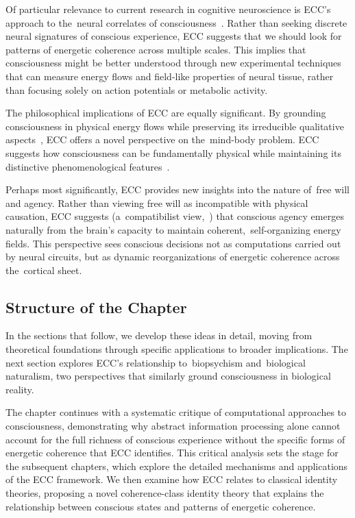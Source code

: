 Of particular relevance to current research in cognitive neuroscience is ECC's approach to the~neural correlates of consciousness~\cite{dehaene2011experimental}. Rather than seeking discrete neural signatures of conscious experience, ECC suggests that we should look for patterns of energetic coherence across multiple scales. This implies that consciousness might be better understood through new experimental techniques that can measure energy flows and field-like properties of neural tissue, rather than focusing solely on action potentials or metabolic activity.

The philosophical implications of ECC are equally significant. By grounding consciousness in physical energy flows while preserving its irreducible qualitative aspects~\cite{nagel1980like}, ECC offers a novel perspective on the~mind-body problem. ECC suggests how consciousness can be fundamentally physical while maintaining its distinctive phenomenological features~\cite{block1995confusion}.

Perhaps most significantly, ECC provides new insights into the nature of~free will and agency. Rather than viewing free will as incompatible with physical causation, ECC suggests (a~compatibilist view,~\cite{Beebee2002}) that conscious agency emerges naturally from the brain's capacity to maintain coherent,~self-organizing energy fields. This perspective sees conscious decisions not as computations carried out by neural circuits, but as dynamic reorganizations of energetic coherence across the~cortical sheet.

\subsection*{Structure of the Chapter}

In the sections that follow, we develop these ideas in detail, moving from theoretical foundations through specific applications to broader implications. The next section explores ECC's relationship to~biopsychism and~biological naturalism, two perspectives that similarly ground consciousness in biological reality. 

The chapter continues with a systematic critique of computational approaches to consciousness, demonstrating why abstract information processing alone cannot account for the full richness of conscious experience without the specific forms of energetic coherence that ECC identifies. This critical analysis sets the stage for the subsequent chapters, which explore the detailed mechanisms and applications of the ECC framework. We then examine how ECC relates to classical identity theories, proposing a novel coherence-class identity theory that explains the relationship between conscious states and patterns of energetic coherence.


